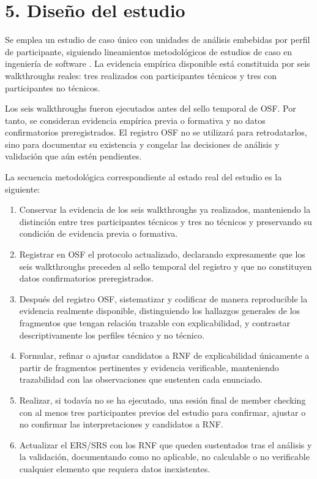 \documentclass[9pt,a4paper]{extarticle}
\begin{document}
\section*{5. Diseño del estudio}

Se emplea un estudio de caso único con unidades de análisis embebidas por perfil de participante, siguiendo lineamientos metodológicos de estudios de caso en ingeniería de software \cite{runeson2009,wohlin2012}. La evidencia empírica disponible está constituida por seis walkthroughs reales: tres realizados con participantes técnicos y tres con participantes no técnicos.

Los seis walkthroughs fueron ejecutados antes del sello temporal de OSF. Por tanto, se consideran evidencia empírica previa o formativa y no datos confirmatorios preregistrados. El registro OSF no se utilizará para retrodatarlos, sino para documentar su existencia y congelar las decisiones de análisis y validación que aún estén pendientes.

La secuencia metodológica correspondiente al estado real del estudio es la siguiente:

\begin{enumerate}
\item Conservar la evidencia de los seis walkthroughs ya realizados, manteniendo la distinción entre tres participantes técnicos y tres no técnicos y preservando su condición de evidencia previa o formativa.
\item Registrar en OSF el protocolo actualizado, declarando expresamente que los seis walkthroughs preceden al sello temporal del registro y que no constituyen datos confirmatorios preregistrados.
\item Después del registro OSF, sistematizar y codificar de manera reproducible la evidencia realmente disponible, distinguiendo los hallazgos generales de los fragmentos que tengan relación trazable con explicabilidad, y contrastar descriptivamente los perfiles técnico y no técnico.
\item Formular, refinar o ajustar candidatos a RNF de explicabilidad únicamente a partir de fragmentos pertinentes y evidencia verificable, manteniendo trazabilidad con las observaciones que sustenten cada enunciado.
\item Realizar, si todavía no se ha ejecutado, una sesión final de member checking con al menos tres participantes previos del estudio para confirmar, ajustar o no confirmar las interpretaciones y candidatos a RNF.
\item Actualizar el ERS/SRS con los RNF que queden sustentados tras el análisis y la validación, documentando como no aplicable, no calculable o no verificable cualquier elemento que requiera datos inexistentes.
\end{enumerate}
\end{document}
